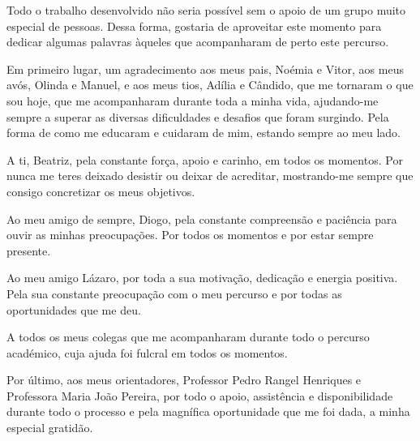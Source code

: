 Todo o trabalho desenvolvido não seria possível sem o apoio de um grupo muito especial de pessoas.
Dessa forma, gostaria de aproveitar este momento para dedicar algumas palavras àqueles que acompanharam de perto este percurso.

Em primeiro lugar, um agradecimento aos meus pais, Noémia e Vitor, aos meus avós, Olinda e Manuel,
e aos meus tios, Adília e Cândido, que me tornaram o que sou hoje,
que me acompanharam durante toda a minha vida, ajudando-me sempre a superar as diversas dificuldades 
e desafios que foram surgindo. Pela forma de como me educaram e cuidaram de mim, estando sempre ao meu lado.

A ti, Beatriz, pela constante força, apoio e carinho, em todos os momentos. Por nunca me teres deixado desistir 
ou deixar de acreditar, mostrando-me sempre que consigo concretizar os meus objetivos.

Ao meu amigo de sempre, Diogo, pela constante compreensão e paciência para ouvir as minhas preocupações.
Por todos os momentos e por estar sempre presente.

Ao meu amigo Lázaro, por toda a sua motivação, dedicação e energia positiva. Pela sua constante preocupação com o meu percurso e por todas as oportunidades que me deu.

A todos os meus colegas que me acompanharam durante todo o percurso académico, cuja ajuda foi fulcral em todos os momentos.

Por último, aos meus orientadores, Professor Pedro Rangel Henriques e Professora Maria João Pereira, por todo o apoio, assistência e disponibilidade durante todo o processo e pela magnífica oportunidade que me foi dada, a minha especial gratidão.